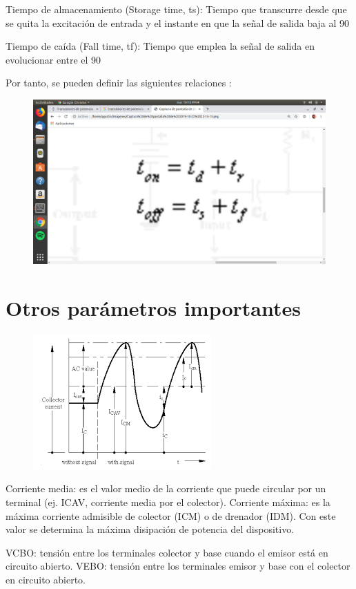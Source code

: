 \documentclass[10pt,letterpaper]{article}
\begin{document}
Tiempo de almacenamiento (Storage time, ts): Tiempo que transcurre desde que se quita la excitación de entrada y el instante en que la señal de salida baja al 90%

Tiempo de caída (Fall time, tf): Tiempo que emplea la señal de salida en evolucionar entre el 90%

Por tanto, se pueden definir las siguientes relaciones :
\begin{figure}[h!]
\centering 
\includegraphics[scale=.1]{5}
\end{figure}
\section{Otros parámetros importantes}
\begin{figure}[h!]
\centering
\includegraphics[scale=1]{4}
\end{figure}

Corriente media: es el valor medio de la corriente que puede circular por un terminal (ej. ICAV, corriente media por el colector).
Corriente máxima: es la máxima corriente admisible de colector (ICM) o de drenador (IDM). Con este valor se determina la máxima disipación de potencia del dispositivo.

VCBO: tensión entre los terminales colector y base cuando el emisor está en circuito abierto.
VEBO: tensión entre los terminales emisor y base con el colector en circuito abierto.
\end{document}
